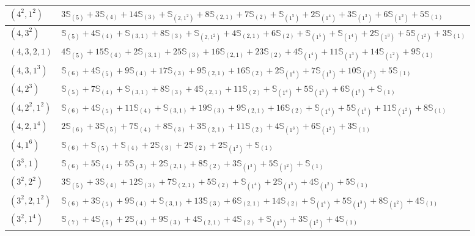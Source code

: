 \documentclass[12pt]{article}
\newcommand{\Schur}[1]{\mathbb{S}_{#1}}
\theoremstyle{plain}
\theoremstyle{definition}
\theoremstyle{remark}
\begin{document}
\begin{table}[h]
\begin{tabular}{|m{1.7cm}|m{15cm}|}
\hline
$(4^2,1^2)$ & $3\Schur{(5)} + 3\Schur{(4)} + 14\Schur{(3)} + \Schur{(2,1^2)} + 8\Schur{(2,1)} + 7\Schur{(2)} + \Schur{(1^5)} + 2\Schur{(1^4)} + 3\Schur{(1^3)} + 6\Schur{(1^2)} + 5\Schur{(1)}$ \\
\hline
$(4,3^2)$ & $\Schur{(5)} + 4\Schur{(4)} + \Schur{(3,1)} + 8\Schur{(3)} + \Schur{(2,1^2)} + 4\Schur{(2,1)} + 6\Schur{(2)} + \Schur{(1^5)} + \Schur{(1^4)} + 2\Schur{(1^3)} + 5\Schur{(1^2)} + 3\Schur{(1)}$ \\
\hline
$(4,3,2,1)$ & $4\Schur{(5)} + 15\Schur{(4)} + 2\Schur{(3,1)} + 25\Schur{(3)} + 16\Schur{(2,1)} + 23\Schur{(2)} + 4\Schur{(1^4)} + 11\Schur{(1^3)} + 14\Schur{(1^2)} + 9\Schur{(1)}$ \\
\hline
$(4,3,1^3)$ & $\Schur{(6)} + 4\Schur{(5)} + 9\Schur{(4)} + 17\Schur{(3)} + 9\Schur{(2,1)} + 16\Schur{(2)} + 2\Schur{(1^4)} + 7\Schur{(1^3)} + 10\Schur{(1^2)} + 5\Schur{(1)}$ \\
\hline
$(4,2^3)$ & $\Schur{(5)} + 7\Schur{(4)} + \Schur{(3,1)} + 8\Schur{(3)} + 4\Schur{(2,1)} + 11\Schur{(2)} + \Schur{(1^4)} + 5\Schur{(1^3)} + 6\Schur{(1^2)} + \Schur{(1)}$ \\
\hline
$(4,2^2,1^2)$ & $\Schur{(6)} + 4\Schur{(5)} + 11\Schur{(4)} + \Schur{(3,1)} + 19\Schur{(3)} + 9\Schur{(2,1)} + 16\Schur{(2)} + \Schur{(1^4)} + 5\Schur{(1^3)} + 11\Schur{(1^2)} + 8\Schur{(1)}$ \\
\hline
$(4,2,1^4)$ & $2\Schur{(6)} + 3\Schur{(5)} + 7\Schur{(4)} + 8\Schur{(3)} + 3\Schur{(2,1)} + 11\Schur{(2)} + 4\Schur{(1^3)} + 6\Schur{(1^2)} + 3\Schur{(1)}$ \\
\hline
$(4,1^6)$ & $\Schur{(6)} + \Schur{(5)} + \Schur{(4)} + 2\Schur{(3)} + 2\Schur{(2)} + 2\Schur{(1^2)} + \Schur{(1)}$ \\
\hline
$(3^3,1)$ & $\Schur{(6)} + 5\Schur{(4)} + 5\Schur{(3)} + 2\Schur{(2,1)} + 8\Schur{(2)} + 3\Schur{(1^3)} + 5\Schur{(1^2)} + \Schur{(1)}$ \\
\hline
$(3^2,2^2)$ & $3\Schur{(5)} + 3\Schur{(4)} + 12\Schur{(3)} + 7\Schur{(2,1)} + 5\Schur{(2)} + \Schur{(1^4)} + 2\Schur{(1^3)} + 4\Schur{(1^2)} + 5\Schur{(1)}$ \\
\hline
$(3^2,2,1^2)$ & $\Schur{(6)} + 3\Schur{(5)} + 9\Schur{(4)} + \Schur{(3,1)} + 13\Schur{(3)} + 6\Schur{(2,1)} + 14\Schur{(2)} + \Schur{(1^4)} + 5\Schur{(1^3)} + 8\Schur{(1^2)} + 4\Schur{(1)}$ \\
\hline
$(3^2,1^4)$ & $\Schur{(7)} + 4\Schur{(5)} + 2\Schur{(4)} + 9\Schur{(3)} + 4\Schur{(2,1)} + 4\Schur{(2)} + \Schur{(1^3)} + 3\Schur{(1^2)} + 4\Schur{(1)}$ \\

\end{tabular}
\end{table}
\end{document}

